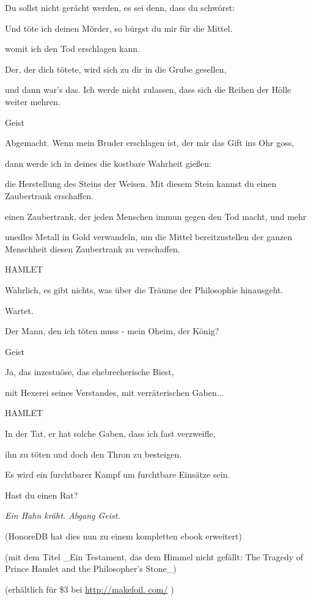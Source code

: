 {Du sollst nicht gerächt werden, es sei denn, dass du schwörst:

Und töte ich deinen Mörder, so bürgst du mir für die Mittel.

womit ich den Tod erschlagen kann.

Der, der dich tötete, wird sich zu dir in die Grube gesellen,

und dann war's das. Ich werde nicht zulassen, dass sich die Reihen der Hölle weiter mehren.

Geist

Abgemacht. Wenn mein Bruder erschlagen ist, der mir das Gift ins Ohr goss,

dann werde ich in deines die kostbare Wahrheit gießen:

die Herstellung des Steins der Weisen. Mit diesem Stein kannst du einen Zaubertrank erschaffen.

einen Zaubertrank, der jeden Menschen immun gegen den Tod macht, und mehr

unedles Metall in Gold verwandeln, um die Mittel bereitzustellen der ganzen Menschheit diesen Zaubertrank zu verschaffen.

HAMLET

Wahrlich, es gibt nichts, was über die Träume der Philosophie hinausgeht.

Wartet.

Der Mann, den ich töten muss - mein Oheim, der König?

Geist

Ja, das inzestuöse, das ehebrecherische Biest,

mit Hexerei seines Verstandes, mit verräterischen Gaben...

HAMLET

In der Tat, er hat solche Gaben, dass ich fast verzweifle,

ihn zu töten und doch den Thron zu besteigen.

Es wird ein furchtbarer Kampf um furchtbare Einsätze sein.

Hast du einen Rat?

\emph{\emph{Ein Hahn kräht. Abgang Geist.}}

(HonoreDB hat dies nun zu einem kompletten ebook erweitert)

(mit dem Titel \_Ein Testament, das dem Himmel nicht gefällt: The Tragedy of Prince Hamlet and the Philosopher's Stone\_)

(erhältlich für \$3 bei \href{http://makefoil.\%20com/“\%20target=}{http://makefoil. com/} )

}
